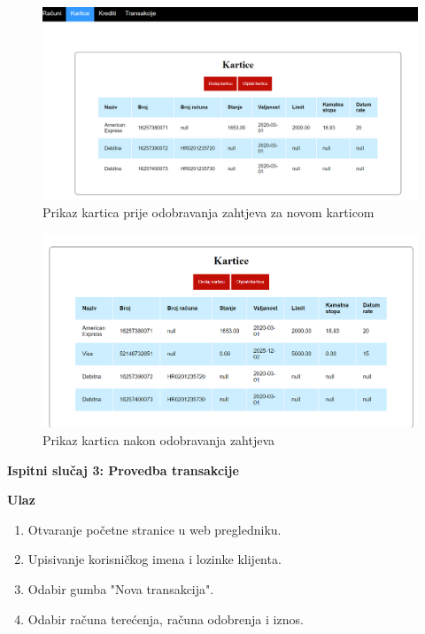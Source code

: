 		\begin{figure}[H]
			\includegraphics[scale=0.5]{slike/karticeprije.PNG}
			\centering
			\caption{Prikaz kartica prije odobravanja zahtjeva za novom karticom}
			\label{fig:prije}
		\end{figure}
		\begin{figure}[H]
			\includegraphics[scale=0.5]{slike/karticeposlije.PNG}
			\centering
			\caption{Prikaz kartica nakon odobravanja zahtjeva}
			\label{fig:poslije}
		\end{figure}
	
	\textbf{Ispitni slučaj 3: Provedba transakcije} 
	
	\textbf{Ulaz}
	
	\begin{enumerate}
		
		\item Otvaranje početne stranice u web pregledniku.
		\item Upisivanje korisničkog imena i lozinke klijenta.
		\item Odabir gumba "Nova transakcija".
		\item Odabir računa terećenja, računa odobrenja i iznos.
		
	\end{enumerate}
	
